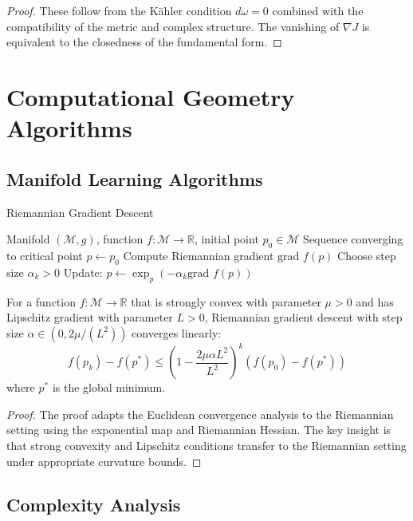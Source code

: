 \begin{proof}
These follow from the Kähler condition $d\omega = 0$ combined with the compatibility of the metric and complex structure. The vanishing of $\nabla J$ is equivalent to the closedness of the fundamental form.
\end{proof}

\section{Computational Geometry Algorithms}

\subsection{Manifold Learning Algorithms}

\begin{algorithm}
\caption{Riemannian Gradient Descent}
\begin{algorithmic}[1]
\Require Manifold $(\mathcal{M}, g)$, function $f: \mathcal{M} \to \mathbb{R}$, initial point $p_0 \in \mathcal{M}$
\Ensure Sequence converging to critical point
\State $p \leftarrow p_0$
    \State Compute Riemannian gradient $\text{grad } f(p)$
    \State Choose step size $\alpha_k > 0$
    \State Update: $p \leftarrow \exp_p(-\alpha_k \text{grad } f(p))$
\EndFor
\end{algorithmic}
\end{algorithm}

\begin{theorem}
\label{thm:riemannian_convergence}
For a function $f: \mathcal{M} \to \mathbb{R}$ that is strongly convex with parameter $\mu > 0$ and has Lipschitz gradient with parameter $L > 0$, Riemannian gradient descent with step size $\alpha \in (0, 2\mu/(L^2))$ converges linearly:
$$f(p_k) - f(p^*) \leq \left(1 - \frac{2\mu\alpha L^2}{L^2}\right)^k (f(p_0) - f(p^*))$$
where $p^*$ is the global minimum.
\end{theorem}

\begin{proof}
The proof adapts the Euclidean convergence analysis to the Riemannian setting using the exponential map and Riemannian Hessian. The key insight is that strong convexity and Lipschitz conditions transfer to the Riemannian setting under appropriate curvature bounds.
\end{proof}

\subsection{Complexity Analysis}

